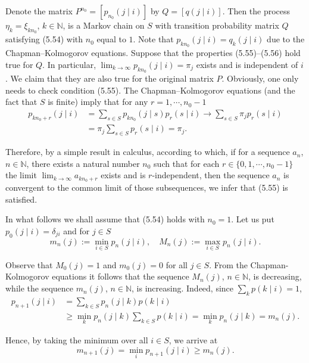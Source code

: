 \begin{Proof}
Denote the matrix $P^{n_0} = [p_{n_0}(j \mid i)]$ by $Q = [q(j \mid i)]$. Then the process $\eta_k = \xi_{kn_0}$, $k \in \mathbb{N}$, is a Markov chain on $S$ with transition probability matrix $Q$ satisfying (5.54) with $n_0$ equal to $1$. Note that $p_{kn_0}(j \mid i) = q_k(j \mid i)$ due to the Chapman--Kolmogorov equations. Suppose that the properties (5.55)--(5.56) hold true for $Q$. In particular, $\lim_{k \to \infty} p_{kn_0}(j \mid i) = \pi_j$ exists and is independent of $i$. We claim that they are also true for the original matrix $P$. Obviously, one only needs to check condition (5.55). The Chapman--Kolmogorov equations (and the fact that $S$ is finite) imply that for any $r = 1, \cdots, n_0 - 1$
\[
\begin{aligned}
p_{kn_0+r}(j \mid i) &= \sum_{s \in S} p_{kn_0}(j \mid s) p_r(s \mid i) \to \sum_{s \in S} \pi_j p_r(s \mid i) \\
&= \pi_j \sum_{s \in S} p_r(s \mid i) = \pi_j.
\end{aligned}
\]

Therefore, by a simple result in calculus, according to which, if for a sequence $a_n$, $n \in \mathbb{N}$, there exists a natural number $n_0$ such that for each $r \in \{0, 1, \cdots, n_0-1\}$ the limit $\lim_{k \to \infty} a_{kn_0+r}$ exists and is $r$-independent, then the sequence $a_n$ is convergent to the common limit of those subsequences, we infer that (5.55) is satisfied.

In what follows we shall assume that (5.54) holds with $n_0 = 1$. Let us put $p_0(j \mid i) = \delta_{ji}$ and for $j \in S$
\[
m_n(j) := \min_{i \in S} p_n(j \mid i), \quad M_n(j) := \max_{i \in S} p_n(j \mid i).
\]

Observe that $M_0(j) = 1$ and $m_0(j) = 0$ for all $j \in S$. From the Chapman-Kolmogorov equations it follows that the sequence $M_n(j)$, $n \in \mathbb{N}$, is decreasing, while the sequence $m_n(j)$, $n \in \mathbb{N}$, is increasing. Indeed, since $\sum_k p(k \mid i) = 1$,
\[
\begin{aligned}
p_{n+1}(j \mid i) &= \sum_{k \in S} p_n(j \mid k) p(k \mid i) \\
&\geq \min_k p_n(j \mid k) \sum_{k \in S} p(k \mid i) = \min_k p_n(j \mid k) = m_n(j).
\end{aligned}
\]

Hence, by taking the minimum over all $i \in S$, we arrive at
\[
m_{n+1}(j) = \min_i p_{n+1}(j \mid i) \geq m_n(j).
\]


\end{Proof}
